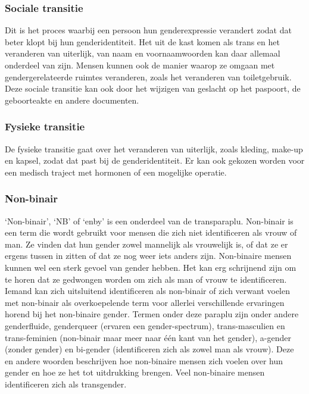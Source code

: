 \documentclass[12pt,openany]{book}
\begin{document}
\subsubsection*{Sociale transitie}

Dit is het proces waarbij een persoon hun genderexpressie verandert zodat dat beter klopt bij hun genderidentiteit. Het uit de kast komen als trans en het veranderen van uiterlijk, van naam en voornaamwoorden kan daar allemaal onderdeel van zijn. Mensen kunnen ook de manier waarop ze omgaan met gendergerelateerde ruimtes veranderen, zoals het veranderen van toiletgebruik. Deze sociale transitie kan ook door het wijzigen van geslacht op het paspoort, de geboorteakte en andere documenten.

\subsubsection*{Fysieke transitie}

De fysieke transitie gaat over het veranderen van uiterlijk, zoals kleding, make-up en kapsel, zodat dat past bij de genderidentiteit. Er kan ook gekozen worden voor een medisch traject met hormonen of een mogelijke operatie.  

\subsubsection*{Non-binair}

`Non-binair', `NB' of `enby' is een onderdeel van de transparaplu. Non-binair is een term die wordt gebruikt voor mensen die zich niet identificeren als vrouw of man. Ze vinden dat hun gender zowel mannelijk als vrouwelijk is, of dat ze er ergens tussen in zitten of dat ze nog weer iets anders zijn. Non-binaire mensen kunnen wel een sterk gevoel van gender hebben. Het kan erg schrijnend zijn om te horen dat ze gedwongen worden om zich als man of vrouw te identificeren. Iemand kan zich uitsluitend identificeren als non-binair of zich verwant voelen met non-binair als overkoepelende term voor allerlei verschillende ervaringen horend bij het non-binaire gender. Termen onder deze paraplu zijn onder andere genderfluide, genderqueer (ervaren een gender-spectrum), trans-masculien en trans-feminien (non-binair maar meer naar één kant van het gender), a-gender (zonder gender) en bi-gender (identificeren zich als zowel man als vrouw). Deze en andere woorden beschrijven hoe non-binaire mensen zich voelen over hun gender en hoe ze het tot uitdrukking brengen. Veel non-binaire mensen identificeren zich als transgender. 
\end{document}
